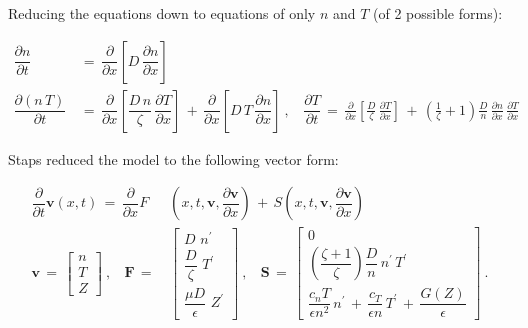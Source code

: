 \documentclass[a4paper,8pt]{article}
\begin{document}
\normalsize

Reducing the equations down to equations of only \(n\) and \(T\) (of 2
possible forms): \small

\begin{align}
    \dfrac{\partial n}{\partial t} \,&=\, \dfrac{\partial}{\partial x}\left[D \, \dfrac{\partial n}{\partial x}\right] \\
    \dfrac{\partial(n\,T)}{\partial t} \,&=\, \dfrac{\partial}{\partial x}\left[\dfrac{D\,n}{\zeta} \, \dfrac{\partial T}{\partial x}\right] \,+\, \dfrac{\partial}{\partial x}\left[D\,T \, \dfrac{\partial n}{\partial x}\right]~, ~~~~ \dfrac{\partial T}{\partial t} \,=\, \frac{\partial }{\partial x}\left[\frac{D}{\zeta} \, \frac{\partial T}{\partial x}\right] \,+\, \left(\frac{1}{\zeta} + 1\right) \frac{D}{n} \, \frac{\partial n}{\partial x} \, \frac{\partial T}{\partial x}
\end{align}

\normalsize

Staps reduced the model to the following vector form: \small

\begin{align}
    \dfrac{\partial}{\partial t} \mathbf{v}(x,t) \,=\, \dfrac{\partial}{\partial x} F&\left(x, t, \mathbf{v}, \dfrac{\partial\mathbf{v}}{\partial x}\right) \,+\, S\left(x, t, \mathbf{v}, \dfrac{\partial\mathbf{v}}{\partial x}\right) \\
\mathbf{v} \,=\,\begin{bmatrix} n \\[1ex] T \\[1ex] Z \end{bmatrix}~,~~~~
\mathbf{F} \,=\, &\begin{bmatrix}
            D\,\, n^\prime \\[1ex]
            \dfrac{D}{\zeta}\,\, T^\prime \\[2ex]
            \dfrac{\mu D}{\epsilon}\,\, Z^\prime
            \end{bmatrix}~,~~~~
\mathbf{S} \,=\, \begin{bmatrix}
            0 \\[1ex]
            \left(\dfrac{\zeta + 1}{\zeta}\right) \dfrac{D}{n} \, n^\prime \, T^\prime \\[2ex]
            \dfrac{c_n T}{\epsilon n^2} \, n^\prime \,+\, \dfrac{c_T}{\epsilon n} \, T^\prime \,+\, \dfrac{G(Z)}{\epsilon}
            \end{bmatrix}~.
\end{align}
\end{document}
